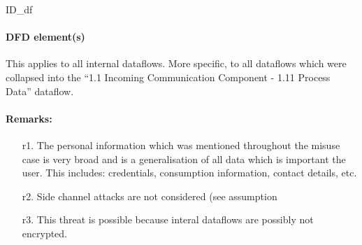 ID\_df

\paragraph{DFD element(s)}

This applies to all internal dataflows. More specific, to all dataflows which
were collapsed into the ``1.1 Incoming Communication Component - 1.11 Process
Data'' dataflow.

\paragraph{Remarks:}
	\begin{enumerate}
         \item[r1.] The personal information which was mentioned throughout the
         misuse case is very broad and is a generalisation of all data which is
         important the user. This includes: credentials, consumption
         information, contact details, etc.
         \item[r2.] Side channel attacks are not considered (see assumption
         \item[r3.] This threat is possible because interal dataflows are
         possibly not encrypted.
    \end{enumerate}
